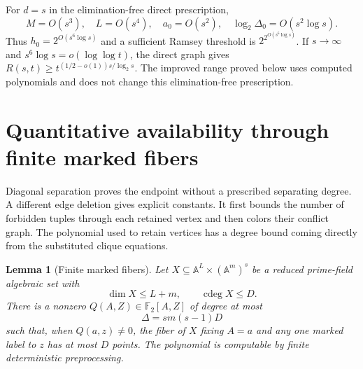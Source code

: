 \documentclass[11pt,a4paper]{article}
\newcommand{\F}{\mathbb F}
\newcommand{\A}{\mathbb A}
\DeclareMathOperator{\cdeg}{cdeg}
\newtheorem{lemma}[theorem]{Lemma}
\theoremstyle{definition}
\theoremstyle{remark}
\numberwithin{equation}{section}
\begin{document}
For $d=s$ in the elimination-free direct prescription,
\[
M=O(s^3),\quad L=O(s^4),\quad a_0=O(s^2),\quad\log_2\Delta_0=O(s^2\log s).
\]
Thus $h_0=2^{O(s^6\log s)}$ and a sufficient Ramsey threshold is $2^{2^{O(s^6\log s)}}$. If $s\to\infty$ and $s^6\log s=o(\log\log t)$, the direct graph gives $R(s,t)\ge t^{(1/2-o(1))s/\log_2s}$. The improved range proved below uses computed polynomials and does not change this elimination-free prescription.

\section{Quantitative availability through finite marked fibers}\label{sec:fibers}
Diagonal separation proves the endpoint without a prescribed separating degree. A different edge deletion gives explicit constants. It first bounds the number of forbidden tuples through each retained vertex and then colors their conflict graph. The polynomial used to retain vertices has a degree bound coming directly from the substituted clique equations.

\begin{lemma}[Finite marked fibers]\label{lem:finite-fibers}
Let $X\subseteq\A^L\times(\A^m)^s$ be a reduced prime-field algebraic set with
\[
\dim X\le L+m,\qquad\cdeg X\le D.
\]
There is a nonzero $Q(A,Z)\in\F_2[A,Z]$ of degree at most
\begin{equation}\label{eq:fiber-Delta}
\Delta=s m(s-1)D
\end{equation}
such that, when $Q(a,z)\ne0$, the fiber of $X$ fixing $A=a$ and any one marked label to $z$ has at most $D$ points. The polynomial is computable by finite deterministic preprocessing.
\end{lemma}
\end{document}
